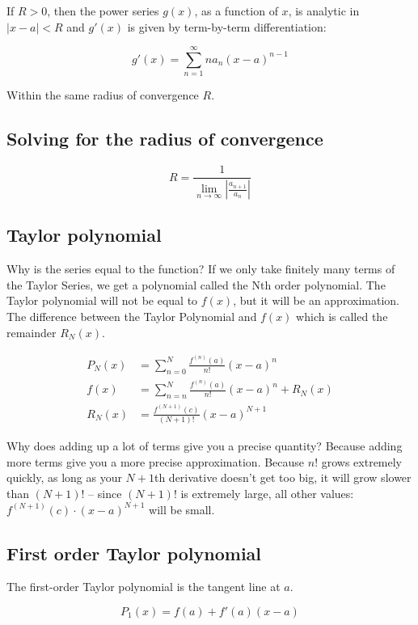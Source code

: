 \documentclass[12pt]{article}
\theoremstyle{plain}
\theoremstyle{remark}
\theoremstyle{definition}
\begin{document}
If \(R > 0\), then the power series \(g(x)\), as a function of \(x\), is
analytic in \(|x - a| < R\) and \(g'(x)\) is given by term-by-term
differentiation:

\[g'(x) = \sum_{n = 1}^{\infty}{na_{n}(x - a)^{n - 1}}\]

Within the same radius of convergence \(R\).


\subsection{Solving for the radius of
convergence}

\[R = \frac{1}{\lim_{n \rightarrow \infty}\left| \frac{a_{n + 1}}{a_{n}} \right|}\]


\subsection{Taylor polynomial}

Why is the series equal to the function? If we only take finitely many
terms of the Taylor Series, we get a polynomial called the Nth order
polynomial. The Taylor polynomial will not be equal to \(f(x)\), but it
will be an approximation. The difference between the Taylor Polynomial
and \(f(x)\) which is called the remainder \(R_{N}(x)\).

\begin{align*}
P_{N}(x) &= \sum_{n = 0}^{N}{\frac{f^{(n)}(a)}{n!}(x - a)^{n}} \\
f(x) &= \sum_{n = n}^{N}{\frac{f^{(n)}(a)}{n!}(x - a)^{n}} + R_{N}(x) \\
R_{N}(x) &= \frac{f^{(N + 1)}(c)}{(N + 1)!}(x - a)^{N + 1}
\end{align*}


Why does adding up a lot of terms give you a precise quantity? Because
adding more terms give you a more precise approximation. Because \(n!\)
grows extremely quickly, as long as your \(N + 1\)th derivative doesn't
get too big, it will grow slower than \((N + 1)!\) -- since \((N + 1)!\)
is extremely large, all other values:
\(f^{(N + 1)}(c) \cdot (x - a)^{N + 1}\) will be small.


\subsection{First order Taylor
polynomial}

The first-order Taylor polynomial is the tangent line at \(a\).

\[P_{1}(x) = f(a) + f'(a)(x - a)\]
\end{document}
